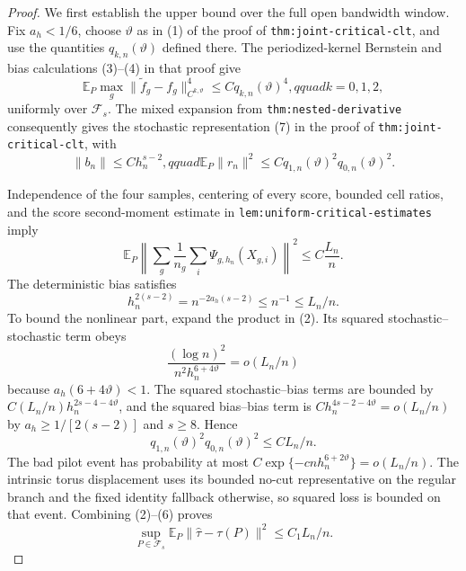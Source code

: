 \documentclass{article}
\begin{document}
\begin{proof}
We first establish the upper bound over the full open bandwidth window.  Fix \(a_h<1/6\), choose \(\vartheta\) as in (1) of the proof of \texttt{thm:joint-critical-clt}, and use the quantities \(q_{k,n}(\vartheta)\) defined there.  The periodized-kernel Bernstein and bias calculations (3)--(4) in that proof give
\[
 \mathbb E_P\max_g\|\widetilde f_g-f_g\|_{C^{k,\vartheta}}^4
 \leq Cq_{k,n}(\vartheta)^4,qquad k=0,1,2,                           \tag{1}
\]
uniformly over \(\mathcal F_s\).  The mixed expansion from \texttt{thm:nested-derivative} consequently gives the stochastic representation (7) in the proof of \texttt{thm:joint-critical-clt}, with
\[
 \|b_n\|\leq Ch_n^{s-2},qquad
 \mathbb E_P\|r_n\|^2
 \leq Cq_{1,n}(\vartheta)^2q_{0,n}(\vartheta)^2.                     \tag{2}
\]

Independence of the four samples, centering of every score, bounded cell ratios, and the score second-moment estimate in \texttt{lem:uniform-critical-estimates} imply
\[
 \mathbb E_P\left\|
 \sum_g\frac1{n_g}\sum_i\Psi_{g,h_n}(X_{g,i})
 \right\|^2\leq C\frac{L_n}{n}.                                     \tag{3}
\]
The deterministic bias satisfies
\[
 h_n^{2(s-2)}=n^{-2a_h(s-2)}\leq n^{-1}\leq L_n/n.                   \tag{4}
\]
To bound the nonlinear part, expand the product in (2).  Its squared stochastic--stochastic term obeys
\[
 \frac{(\log n)^2}{n^2h_n^{6+4\vartheta}}
 =o(L_n/n)                                                             \tag{5}
\]
because \(a_h(6+4\vartheta)<1\).  The squared stochastic--bias terms are bounded by
\(C(L_n/n)h_n^{2s-4-4\vartheta}\), and the squared bias--bias term is
\(Ch_n^{4s-2-4\vartheta}=o(L_n/n)\) by
\(a_h\geq1/[2(s-2)]\) and \(s\geq8\).  Hence
\[
 q_{1,n}(\vartheta)^2q_{0,n}(\vartheta)^2\leq C L_n/n.               \tag{6}
\]
The bad pilot event has probability at most
\(C\exp\{-cnh_n^{6+2\vartheta}\}=o(L_n/n)\).  The intrinsic torus displacement uses its bounded no-cut representative on the regular branch and the fixed identity fallback otherwise, so squared loss is bounded on that event.  Combining (2)--(6) proves
\[
 \sup_{P\in\mathcal F_s}
 \mathbb E_P\|\widehat\tau-\tau(P)\|^2
 \leq C_1L_n/n.                                                        \tag{7}
\]


\end{proof}
\end{document}
